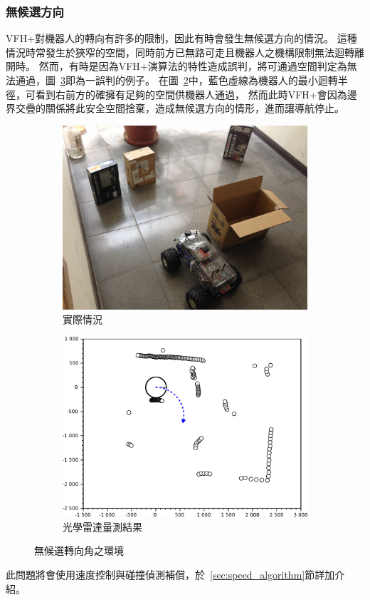 \subsubsection{無候選方向}
VFH+對機器人的轉向有許多的限制，因此有時會發生無候選方向的情況。
這種情況時常發生於狹窄的空間，同時前方已無路可走且機器人之機構限制無法迴轉離開時。
然而，有時是因為VFH+演算法的特性造成誤判，將可通過空間判定為無法通過，圖~\ref{f:no_way_to_go}即為一誤判的例子。
在圖~\ref{f:no_way_to_go_measured}中，藍色虛線為機器人的最小迴轉半徑，可看到右前方的確擁有足夠的空間供機器人通過，
然而此時VFH+會因為邊界交疊的關係將此安全空間捨棄，造成無候選方向的情形，進而讓導航停止。
\begin{figure}[h!]
	\centering
	\begin{subfigure}[t]{0.48\textwidth}
		\includegraphics[width=\textwidth]{figures/algorithm/NoWayToGo_Real}
		\caption{實際情況}
		\label{f:no_way_to_go_real}
	\end{subfigure}
	\begin{subfigure}[t]{0.48\textwidth}
		\includegraphics[width=\textwidth]{figures/algorithm/NoWayToGo}
		\caption{光學雷達量測結果}
		\label{f:no_way_to_go_measured}
	\end{subfigure}
	\caption{無候選轉向角之環境}
	\label{f:no_way_to_go}
\end{figure}
此問題將會使用速度控制與碰撞偵測補償，於~\ref{sec:speed_algorithm}節詳加介紹。


